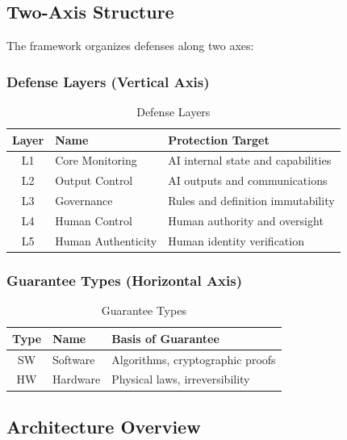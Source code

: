 \documentclass[11pt,a4paper]{article}
\begin{document}
\subsection{Two-Axis Structure}

The framework organizes defenses along two axes:

\subsubsection{Defense Layers (Vertical Axis)}

\begin{table}[htbp]
\centering
\caption{Defense Layers}
\label{tab:layers}
\begin{tabular}{@{}clp{6cm}@{}}
\toprule
Layer & Name & Protection Target \\
\midrule
L1 & Core Monitoring & AI internal state and capabilities \\
L2 & Output Control & AI outputs and communications \\
L3 & Governance & Rules and definition immutability \\
L4 & Human Control & Human authority and oversight \\
L5 & Human Authenticity & Human identity verification \\
\bottomrule
\end{tabular}
\end{table}

\subsubsection{Guarantee Types (Horizontal Axis)}

\begin{table}[htbp]
\centering
\caption{Guarantee Types}
\label{tab:guarantees}
\begin{tabular}{@{}clp{6cm}@{}}
\toprule
Type & Name & Basis of Guarantee \\
\midrule
SW & Software & Algorithms, cryptographic proofs \\
HW & Hardware & Physical laws, irreversibility \\
\bottomrule
\end{tabular}
\end{table}

\subsection{Architecture Overview}
\end{document}
